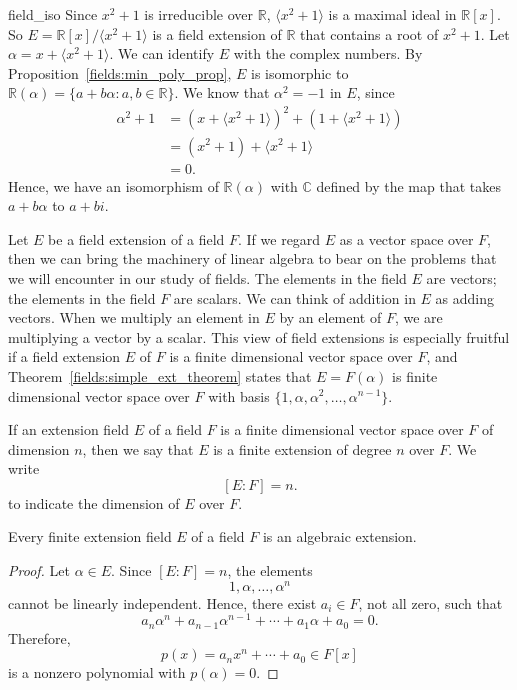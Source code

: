 \begin{example}{field_iso}
Since $x^2 + 1$ is irreducible over ${\mathbb R}$, $\langle x^2 + 1
\rangle$ is a maximal ideal in ${\mathbb R}[x]$. So $E = {\mathbb
R}[x]/\langle x^2 + 1 \rangle$ is a field extension of ${\mathbb R}$ that
contains a root of $x^2 + 1$. Let $\alpha = x + \langle x^2 + 1
\rangle$. We can identify $E$ with the complex numbers. By
Proposition~\ref{fields:min_poly_prop}, $E$ is isomorphic to ${\mathbb R}( \alpha ) = \{ a + b
\alpha : a, b \in {\mathbb R} \}$. We know that $\alpha^2 = -1$ in $E$,
since 
\begin{align*}
\alpha^2 + 1 & = (x + \langle  x^2 +1  \rangle)^2 + ( 1  +
\langle  x^2 +1  \rangle)
\\
& = (x^2 + 1) +  \langle  x^2 + 1  \rangle \\
& = 0.
\end{align*}
Hence, we have an isomorphism of ${\mathbb R}( \alpha )$ with ${\mathbb C}$
defined by the map that takes $a + b \alpha$ to $a + bi$. 
\end{example}
 


Let $E$ be a field extension of a field $F$.  If we regard $E$ as a
vector space over $F$, then we can bring the machinery of linear
algebra to bear on the problems that we will encounter in our study of
fields. The elements in the field $E$ are vectors; the elements
in the field $F$ are scalars. We can think of addition in $E$ as
adding vectors.  When we multiply an element in $E$ by an element of
$F$, we are multiplying a vector by a scalar.  This view of field 
extensions is especially fruitful if a field extension $E$ of $F$ 
is a finite dimensional vector space over $F$, and Theorem~\ref{fields:simple_ext_theorem} states
that $E = F(\alpha )$ is finite dimensional vector space over $F$ with
basis $\{ 1, \alpha, {\alpha}^2, \ldots, {\alpha}^{n-1} \}$.  
 

If an extension field $E$ of a field $F$ is a finite dimensional
vector space over $F$ of dimension $n$, then we say that $E$ is a 
{\bfi finite extension of degree $n$ over
$F$}.  We write  
\[
[E:F]= n.\label{notedegext}
\] 
to indicate the dimension of $E$ over $F$.
 

\begin{theorem}\label{fields:finite_ext_theorem}
Every finite extension field $E$ of a field $F$ is an algebraic extension. 
\end{theorem}
 

\begin{proof}
Let $\alpha \in E$. Since $[E:F] =n$, the elements
\[
1, \alpha, \ldots, {\alpha}^n
\]
cannot be linearly independent.  Hence, there exist $a_i \in F$, not
all zero, such that 
\[
a_n {\alpha}^n + a_{n-1} {\alpha}^{n-1} + \cdots + a_1 \alpha + a_0
=0. 
\]
Therefore,
\[
p(x) = a_n x^n + \cdots + a_0 \in F[x]
\]
is a nonzero polynomial with $p( \alpha ) = 0$.
\end{proof}


